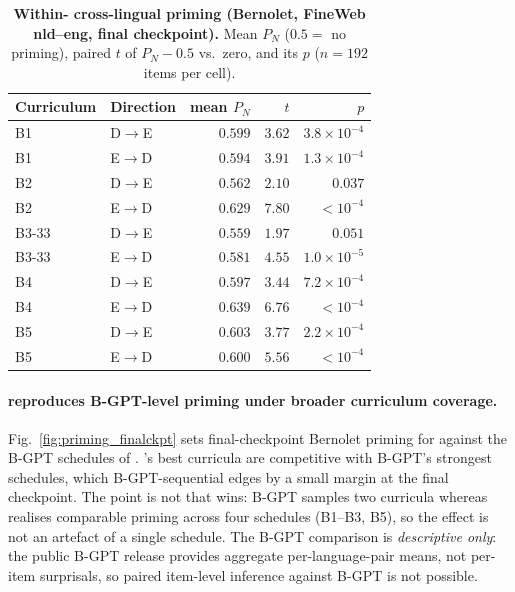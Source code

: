 \begin{table}[!ht]
  \centering \small
  \caption{\textbf{Within-\beetle{} cross-lingual priming (Bernolet, FineWeb nld--eng, final checkpoint).} Mean $P_N$ ($0.5=$ no priming), paired $t$ of $P_N-0.5$ vs.\ zero, and its $p$ ($n{=}192$ items per cell).}
  \label{tab:priming_within_model}
  \begin{tabular}{llrrr}
    \toprule
    Curriculum & Direction & mean $P_N$ & $t$ & $p$ \\
    \midrule
    B1    & D$\to$E & $0.599$ & $3.62$ & $3.8{\times}10^{-4}$ \\
    B1    & E$\to$D & $0.594$ & $3.91$ & $1.3{\times}10^{-4}$ \\
    B2    & D$\to$E & $0.562$ & $2.10$ & $0.037$ \\
    B2    & E$\to$D & $0.629$ & $7.80$ & $<10^{-4}$ \\
    B3-33 & D$\to$E & $0.559$ & $1.97$ & $0.051$ \\
    B3-33 & E$\to$D & $0.581$ & $4.55$ & $1.0{\times}10^{-5}$ \\
    B4    & D$\to$E & $0.597$ & $3.44$ & $7.2{\times}10^{-4}$ \\
    B4    & E$\to$D & $0.639$ & $6.76$ & $<10^{-4}$ \\
    B5    & D$\to$E & $0.603$ & $3.77$ & $2.2{\times}10^{-4}$ \\
    B5    & E$\to$D & $0.600$ & $5.56$ & $<10^{-4}$ \\
    \bottomrule
  \end{tabular}
\end{table}
 
\paragraph{\beetle{} reproduces B-GPT-level priming under broader curriculum coverage.} Fig.~\ref{fig:priming_finalckpt} sets final-checkpoint Bernolet priming for \beetle{} against the B-GPT schedules of \citet{arnett-etal-2025-acquisition}. \beetle{}'s best curricula are competitive with B-GPT's strongest schedules, which B-GPT-sequential edges by a small margin at the final checkpoint. The point is not that \beetle{} wins: B-GPT samples two curricula whereas \beetle{} realises comparable priming across four schedules (B1--B3, B5), so the effect is not an artefact of a single schedule. The B-GPT comparison is \emph{descriptive only}: the public B-GPT release provides aggregate per-language-pair means, not per-item surprisals, so paired item-level inference against B-GPT is not possible.
 
